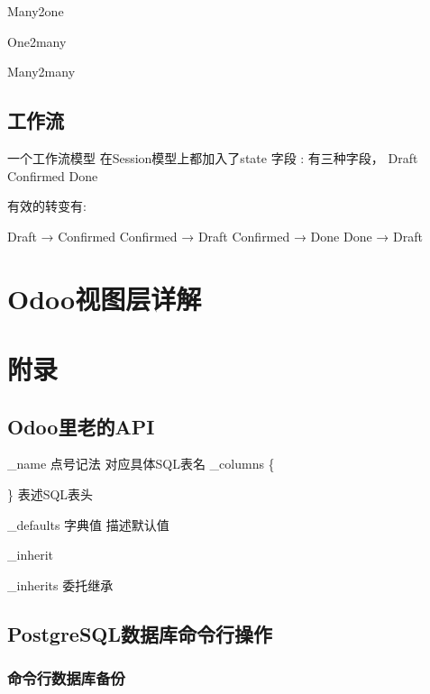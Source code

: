 \documentclass[11pt,a4paper]{sphinxmanual}
\begin{document}
Many2one

One2many

Many2many



\section{工作流}
\label{sec-11-6}
一个工作流模型 在Session模型上都加入了state 字段  : 有三种字段， Draft Confirmed Done

有效的转变有: 

Draft →  Confirmed 
Confirmed → Draft
Confirmed → Done
Done → Draft 






\chapter{Odoo视图层详解}
\label{sec-12}

















\chapter{附录}
\label{sec-13}
\section{Odoo里老的API}
\label{sec-13-1}


\_name 点号记法  对应具体SQL表名
\_columns \{

\}         表述SQL表头

\_defaults  字典值 描述默认值

\_inherit

\_inherits 委托继承



\section{PostgreSQL数据库命令行操作}
\label{sec-13-2}
\subsection{命令行数据库备份}
\label{sec-13-2-1}
\end{document}
